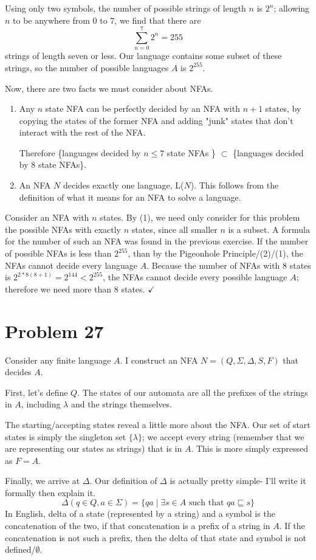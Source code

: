 \documentclass[11pt]{article}
\begin{document}
Using only two symbols, the number of possible strings of length $n$ is $2^n$; allowing $n$ to be anywhere from 0 to 7, we find that there are 
	\[ \sum _{n=0} ^7 2^n = 255 \] 
strings of length seven or less. Our language contains some subset of these strings, so the number of possible languages $A$ is $2^{255}$.

Now, there are two facts we must consider about NFAs. 
	\begin{enumerate}[(1)]
		\item Any $n$ state NFA can be perfectly decided by an NFA with $n+1$ states, by copying the states of the former NFA and adding "junk" states that don't interact with the rest of the NFA. 
		
		Therefore \{languages decided by $n \leq 7$ state NFAs \} $\subset$ \{languages decided by 8 state NFAs\}.
		\item An NFA $N$ decides exactly one language, L($N$). This follows from the definition of what it means for an NFA to solve a language.
	\end{enumerate}

Consider an NFA with $n$ states. By (1), we need only consider for this problem the possible NFAs with exactly $n$ states, since all smaller $n$ is a subset. A formula for the number of such an NFA was found in the previous exercise. If the number of possible NFAs is less than $2^{255}$, than by the Pigeonhole Principle/(2)/(1), the NFAs cannot decide every language $A$. Because the number of NFAs with 8 states is $2^{2*8(8+1)} = 2^{144} < 2^{255}$, the NFAs cannot decide every possible language $A$; therefore we need more than 8 states. $\checkmark$

\section*{Problem 27}
Consider any finite language $A$. I construct an NFA $N = (Q, \Sigma, \Delta, S, F)$ that decides $A$.

First, let's define $Q$. The states of our automata are all the prefixes of the strings in $A$, including $\lambda$ and the strings themselves.

The starting/accepting states reveal a little more about the NFA. Our set of start states is simply the singleton set $\{\lambda\}$; we accept every string (remember that we are representing our states as strings) that is in $A$. This is more simply expressed as $F = A$.

Finally, we arrive at $\Delta$. Our definition of $\Delta$ is actually pretty simple- I'll write it formally then explain it.
	\[ \Delta( q \in Q, a \in \Sigma ) = \{ qa \mid \exists s \in A \text{ such that } qa \sqsubseteq s \} \]
In English, delta of a state (represented by a string)  and a symbol is the concatenation of the two, if that concatenation is a prefix of a string in $A$. If the concatenation is not such a prefix, then the delta of that state and symbol is not defined/$\emptyset$.
\end{document}
